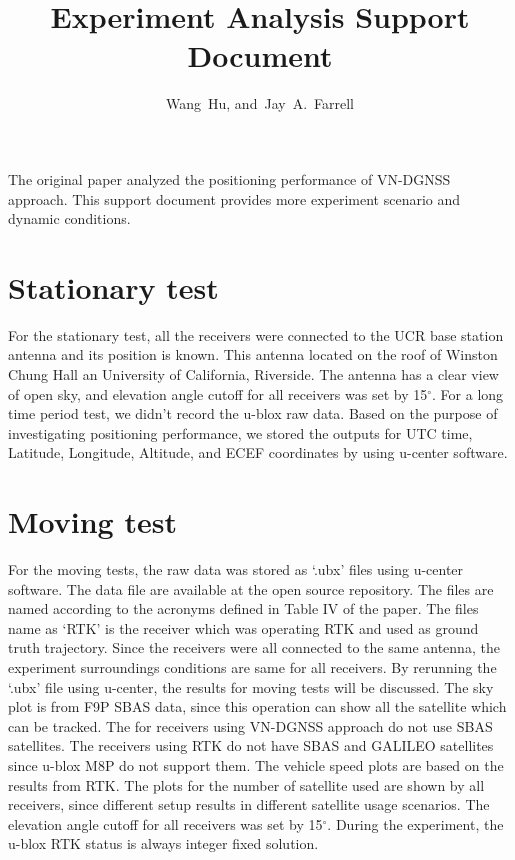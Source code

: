 \documentclass[letterpaper, 10 pt,onecolumn]{article}
\begin{document}
	\title{Experiment Analysis Support Document}
	\author{Wang~Hu,
		and~Jay~A.~Farrell
	}
	\maketitle
	
	The original paper analyzed the positioning performance of VN-DGNSS approach. This support document provides more experiment scenario and dynamic conditions. 
	
	\section{Stationary test}
	For the stationary test, all the receivers were connected to the UCR base station antenna and its position is known. This antenna located on the roof of Winston Chung Hall an University of California, Riverside. The antenna has a clear view of open sky, and elevation angle cutoff for all receivers was set by 15$^\circ$. For a long time period test, we didn't record the u-blox raw data. Based on the purpose of investigating positioning performance, we stored the outputs for UTC time, Latitude, Longitude, Altitude, and ECEF coordinates by using u-center software.
	
	\section{Moving test}
	For the moving tests, the raw data was stored as `.ubx' files using u-center software. The data file are available at the open source repository. The files are named according to the acronyms defined in Table IV of the paper. The files name as `RTK' is the receiver which was operating RTK and used as ground truth trajectory. Since the receivers were all connected to the same antenna, the experiment surroundings conditions are same for all receivers. By rerunning the `.ubx' file using u-center, the results for moving tests will be discussed. The sky plot is from F9P SBAS data, since this operation can show all the satellite which can be tracked. The for receivers using VN-DGNSS approach do not use SBAS satellites. The receivers using RTK do not have SBAS and GALILEO satellites since u-blox M8P do not support them. The vehicle speed plots are based on the results from RTK. The plots for the number of satellite used are shown by all receivers, since different setup results in different satellite usage scenarios. The elevation angle cutoff for all receivers was set by 15$^\circ$. During the experiment, the u-blox RTK status is always integer fixed solution.
	
\end{document}
